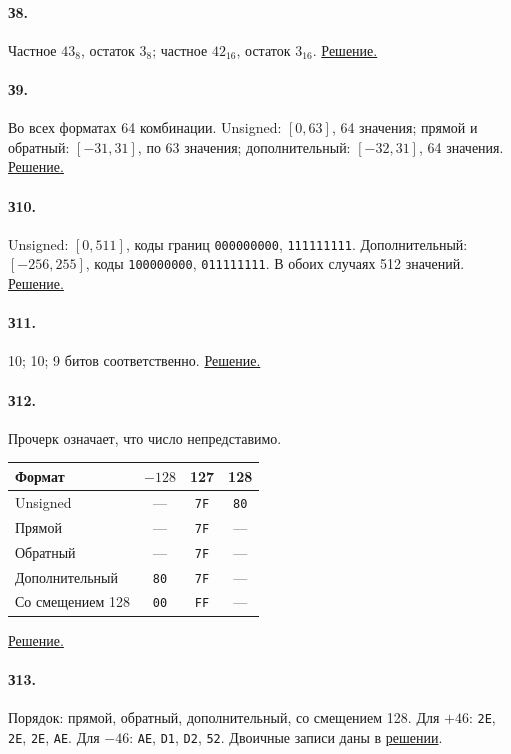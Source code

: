 \paragraph*{З8.}\label{ans:z8}
Частное $43_8$, остаток $3_8$; частное $42_{16}$, остаток $3_{16}$.
\hyperref[sol:z8]{Решение.}

\paragraph*{З9.}\label{ans:z9}
Во всех форматах 64 комбинации. Unsigned: $[0,63]$, 64 значения; прямой и обратный: $[-31,31]$, по 63 значения; дополнительный: $[-32,31]$, 64 значения.
\hyperref[sol:z9]{Решение.}

\paragraph*{З10.}\label{ans:z10}
Unsigned: $[0,511]$, коды границ \texttt{000000000}, \texttt{111111111}. Дополнительный: $[-256,255]$, коды \texttt{100000000}, \texttt{011111111}. В обоих случаях 512 значений.
\hyperref[sol:z10]{Решение.}

\paragraph*{З11.}\label{ans:z11}
10; 10; 9 битов соответственно.
\hyperref[sol:z11]{Решение.}

\paragraph*{З12.}\label{ans:z12}
Прочерк означает, что число непредставимо.
\begin{center}
\begin{tabular}{l|ccc}
Формат & $-128$ & 127 & 128\\\hline
Unsigned & --- & \texttt{7F} & \texttt{80}\\
Прямой & --- & \texttt{7F} & ---\\
Обратный & --- & \texttt{7F} & ---\\
Дополнительный & \texttt{80} & \texttt{7F} & ---\\
Со смещением 128 & \texttt{00} & \texttt{FF} & ---
\end{tabular}
\end{center}
\hyperref[sol:z12]{Решение.}

\paragraph*{З13.}\label{ans:z13}
Порядок: прямой, обратный, дополнительный, со смещением 128.
Для $+46$: \texttt{2E}, \texttt{2E}, \texttt{2E}, \texttt{AE}.
Для $-46$: \texttt{AE}, \texttt{D1}, \texttt{D2}, \texttt{52}.
Двоичные записи даны в \hyperref[sol:z13]{решении}.

